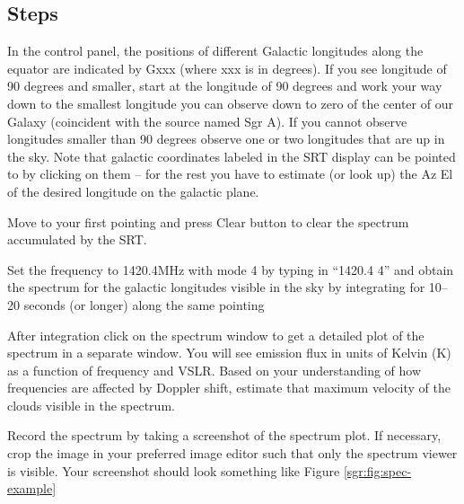 \subsection{Steps}

\begin{steps}
	\item In the control panel, the positions of different Galactic longitudes along
	the equator are indicated by Gxxx (where xxx is in degrees). If you see
	longitude of 90 degrees and smaller, start at the longitude of 90
	degrees and work your way down to the smallest longitude you can
	observe down to zero of the center of our Galaxy (coincident with the
	source named Sgr A). If you cannot observe longitudes smaller than
	90 degrees observe one or two longitudes that are up in the sky. Note
	that galactic coordinates labeled in the SRT display can be pointed to
	by clicking on them – for the rest you have to estimate (or look up) the
	Az El of the desired longitude on the galactic plane. %
	
	\item Move to your first pointing and press Clear button to clear the spectrum accumulated by the SRT.
	
	\item  Set the frequency to 1420.4MHz with mode  4 by typing in ``1420.4 4'' and obtain the spectrum for the galactic longitudes visible in the sky by integrating for 10--20 seconds (or longer) along the same pointing 
	
	\item After integration click on the spectrum window to get a detailed plot of
	the spectrum in a separate window. You will see emission flux in units of Kelvin (K) as a
	function of frequency and VSLR. Based on your understanding of how frequencies are affected by Doppler shift, estimate that maximum velocity of the clouds visible in the spectrum. 
	
	\item Record the spectrum by taking a screenshot of the spectrum plot. If necessary, crop the image in your preferred image editor such that only the spectrum viewer is visible. Your screenshot should look something like Figure \ref{sgr:fig:spec-example}
\end{steps}

